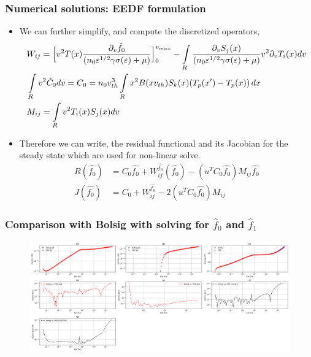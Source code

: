 \documentclass[mathserif, aspectratio=169]{beamer}
\newcommand{\of}[1]{\mleft( #1 \mright)}
\newcommand{\myint}{\int\limits}
\newcommand{\diff}[1]{\, d#1}
\begin{document}
\begin{frame}
	\frametitle{Numerical solutions: EEDF formulation}
	\begin{itemize}
		\item We can further simplify, and compute the discretized operators, 
		{\tiny
		\begin{align*}
			&W_{ij} = \Big[v^2 T(x) \frac{\partial_v \hat f_0}{(n_0 \varepsilon^{1/2}\gamma \sigma\of{\varepsilon} + \mu)}\Big]_0^{v_{max}}-\myint_{R} \frac{\partial_v S_j(x)}{(n_0 \varepsilon^{1/2}\gamma \sigma\of{\varepsilon} + \mu)} v^2 \partial_v T_i(x) dv \\
			&\myint_{R} v^2 \tilde{C}_0 dv = C_{0}  = n_0 v_{th}^3 \myint_{R} x^2 B(x v_{th}) S_k\of{x}  \of{T_p\of{x^\prime} - T_p\of{x}} \diff{x}  \\
			&M_{ij} = \myint_{R} v^2 T_i(x) S_j(x) dv\\
		\end{align*}}
		\item Therefore we can write, the residual functional and its Jacobian for the steady state which are used for non-linear solve. 
		\begin{align*}
			R(\hat{f_0}) &= C_0 \hat{f_0} + W^{\hat{f_0}}_{ij} (\hat{f_0}) - (u^T C_0 \hat{f_0}) M_{ij} \hat{f_0} \\
			J(\hat{f_0}) &= C_0 + W^{\hat{f_0}}_{ij}  - 2(u^T C_0 \hat{f_0}) M_{ij}
		\end{align*}
	\end{itemize}
\end{frame}

\begin{frame}
	\frametitle{\small Comparison with Bolsig with solving for $\hat{f}_0$ and $\hat{f}_1$}
	\begin{figure}
		\includegraphics[width=\textwidth]{PDE_vs_BOLSIG_G0_G2.png}
	\end{figure}
\end{frame}
\end{document}
